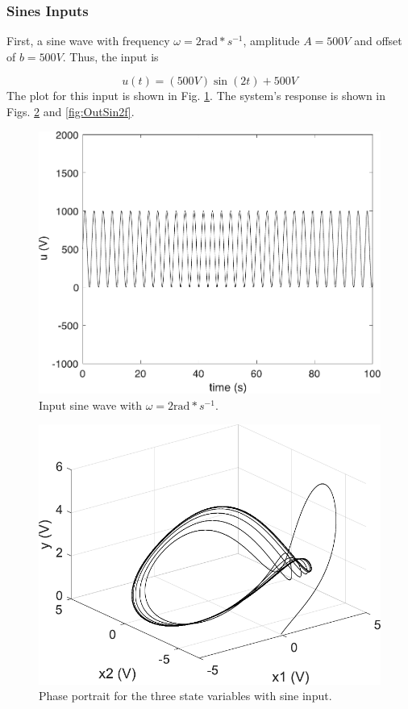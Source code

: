     \subsubsection{Sines Inputs}\label{subsubsec:sines}
    First, a sine wave with frequency $\omega=2\text{rad}*s^{-1}$, amplitude $A=500V$ and offset of $b=500V$. Thus, the input is
    
    \begin{equation}
        u(t)=(500V)\sin({2t})+500V
    \end{equation}
    The plot for this input is shown in Fig. \ref{fig:inputSin2f}. The system's response is shown in Figs. \ref{fig:3dSin2f} and \ref{fig:OutSin2f}.
    \begin{figure}[H]
        \centering
        \includegraphics[scale=0.32]{figs/InputSin2f.pdf}
        \caption{Input sine wave with $\omega=2\text{rad}*s^{-1}$.}
        \label{fig:inputSin2f}
    \end{figure}
    \begin{figure}[H]
        \centering
        \includegraphics[scale=0.45]{figs/3dSine2fInput.pdf}
        \caption{Phase portrait for the three state variables with sine input.}
        \label{fig:3dSin2f}
    \end{figure}
